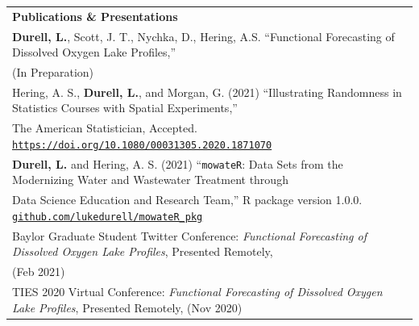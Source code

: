 \documentclass[10pt, hidelinks]{article}
\begin{document}
\noindent
\begin{tabular}{p{19cm}}
\Large{\textbf{Publications \& Presentations}} \vspace{3px}\\
\textbf{Durell, L.}, Scott, J. T., Nychka, D., Hering, A.S. “Functional Forecasting of Dissolved Oxygen Lake Profiles,” \\
\hspace{25px} (In Preparation) \vspace{1px} \\
Hering, A. S., \textbf{Durell, L.}, and Morgan, G. (2021) “Illustrating Randomness in Statistics Courses with Spatial Experiments,” \\
\hspace{25px} The American Statistician, Accepted. \href{https://doi.org/10.1080/00031305.2020.1871070}{\texttt{https://doi.org/10.1080/00031305.2020.1871070}} \vspace{1px} \\
\textbf{Durell, L.} and Hering, A. S. (2021) “\texttt{mowateR}: Data Sets from the Modernizing Water and Wastewater Treatment through \\ 
\hspace{25px} Data Science Education and Research Team,” R package version 1.0.0. \href{https://github.com/lukedurell/mowateR_pkg}{\texttt{github.com/lukedurell/mowateR\_pkg}} \\
Baylor Graduate Student Twitter Conference: \textit{Functional Forecasting of Dissolved Oxygen Lake Profiles}, Presented Remotely,  \\
\hspace{25px} (Feb 2021)  \vspace{1px} \\
TIES 2020 Virtual Conference: \textit{Functional Forecasting of Dissolved Oxygen Lake Profiles}, Presented Remotely, (Nov 2020)  \\
\end{tabular}
\end{document}
